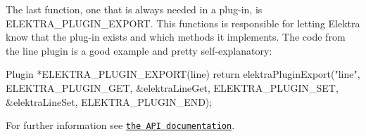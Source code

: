 The last function, one that is always needed in a plug-\/in, is {\ttfamily E\+L\+E\+K\+T\+R\+A\+\_\+\+P\+L\+U\+G\+I\+N\+\_\+\+E\+X\+P\+O\+R\+T}. This functions is responsible for letting Elektra know that the plug-\/in exists and which methods it implements. The code from the line plugin is a good example and pretty self-\/explanatory\+: \begin{DoxyVerb}    Plugin *ELEKTRA_PLUGIN_EXPORT(line)
    {
            return elektraPluginExport("line",
            ELEKTRA_PLUGIN_GET, &elektraLineGet,
            ELEKTRA_PLUGIN_SET, &elektraLineSet,
            ELEKTRA_PLUGIN_END);
    }
\end{DoxyVerb}


For further information see \href{http://doc.libelektra.org/api/current/html/group__plugin.html}{\tt the A\+P\+I documentation}. 